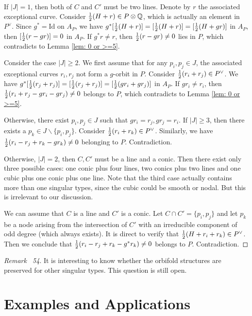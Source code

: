 \documentclass[
]{article}
\begin{document}
If \(|J|=1\), then both of \(C\) and \(C'\) must be two lines. Denote by
\(r\) the associated exceptional curve. Consider
\({1\over2}(H+r)\in P\otimes\mathbb{Q}\), which is actually an element
in \(P^\vee\). Since \(g^*=\mathrm{Id}\) on \(A_P\), we have
\(g^*[{1\over2}(H+r)]=[{1\over2}(H+r)]=[{1\over2}(H+g r)]\) in \(A_P\),
then \([{1\over2}(r-g r)]=0\) in \(A_P\). If \(g^*r\ne r\), then
\({1\over2}(r-g r)\ne 0\) lies in \(P\), which contradicts to Lemma
\ref{lem: 0 or >=5}.

Consider the case \(|J|\ge 2\). We first assume that for any
\(p_i,p_j\in J\), the associated exceptional curves \(r_i, r_j\) not
form a \(g\)-orbit in \(P\). Consider \({1\over2}(r_i+r_j)\in P^\vee\).
We have
\(g^*[{1\over2}(r_j+r_j)]=[{1\over2}(r_j+r_j)]=[{1\over2}(g r_i+g r_j)]\)
in \(A_P\). If \(g r_i\ne r_i\), then
\({1\over2}(r_i+r_j-g r_i-g r_j)\ne 0\) belongs to \(P\), which
contradicts to Lemma \ref{lem: 0 or >=5}.

Otherwise, there exist \(p_i,p_j\in J\) such that
\(g r_i=r_j, g r_j=r_i\). If \(|J|\ge 3\), then there exists a
\(p_k\in J\backslash\{p_i,p_j\}\). Consider
\({1\over2}(r_i+r_k)\in P^\vee\). Similarly, we have
\({1\over2}(r_i-r_j+r_k-g r_k)\ne 0\) belonging to \(P\). Contradiction.

Otherwise, \(|J|=2\), then \(C,C'\) must be a line and a conic. Then
there exist only three possible cases: one conic plus four lines, two
conics plus two lines and one cubic plus one conic plus one line. Note
that the third case actually contains more than one singular types,
since the cubic could be smooth or nodal. But this is irrelevant to our
discussion.

We can assume that \(C\) is a line and \(C'\) is a conic. Let
\(C\cap C'=\{p_i,p_j\}\) and let \(p_k\) be a node arising from the
intersection of \(C'\) with an irreducible component of odd degree
(which always exists). It is direct to verify that
\({1\over2}(H+r_i+r_k)\in P^\vee\). Then we conclude that
\({1\over2}(r_i-r_j+r_k-g^*r_k)\ne 0\) belongs to \(P\).
Contradiction.~◻

\emph{Remark~ 54}. It is interesting to know whether the orbifold
structures are preserved for other singular types. This question is
still open.

\section{Examples and
Applications}\label{sec:ux20examplesux20andux20applications}
\end{document}
